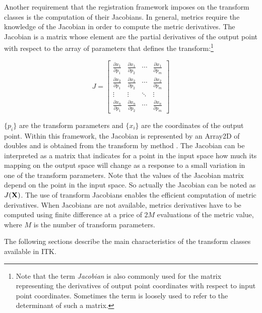 
Another requirement that the registration framework imposes on the transform
classes is the computation of their Jacobians. In general, metrics require
the knowledge of the Jacobian in order to compute the metric derivatives.
The Jacobian is a matrix whose element are the partial derivatives of the
output point with respect to the array of parameters that defines the
transform:\footnote{Note that the term \emph{Jacobian} is also commonly used
for the matrix representing the derivatives of output point coordinates with
respect to input point coordinates. Sometimes the term is loosely used to
refer to the determinant of such a matrix.}

\begin{equation}
J=\left[ \begin{array}{cccc}
\frac{\partial x_{1}}{\partial p_{1}} & 
\frac{\partial x_{1}}{\partial p_{2}} & 
\cdots  & \frac{\partial x_{1}}{\partial p_{m}}\\
\frac{\partial x_{2}}{\partial p_{1}} & 
\frac{\partial x_{2}}{\partial p_{2}} & 
\cdots  & \frac{\partial x_{2}}{\partial p_{m}}\\
\vdots  & \vdots  & \ddots  & \vdots \\
\frac{\partial x_{n}}{\partial p_{1}} & 
\frac{\partial x_{n}}{\partial p_{2}} & 
\cdots  & \frac{\partial x_{n}}{\partial p_{m}}
\end{array}\right]
\end{equation}

$\{p_i\}$ are the transform parameters and $\{x_i\}$ are the
coordinates of the output point.  Within this framework, the Jacobian is
represented by an
Array2D of doubles and is obtained from the transform by method
. The Jacobian can be interpreted as a matrix that
indicates for a point in the input space how much its mapping on the output
space will change as a response to a small variation in one of the transform
parameters. Note that the values of the Jacobian matrix depend on the point
in the input space. So actually the Jacobian can be noted as $J(\bf{X})$. The
use of transform Jacobians enables the efficient computation of metric
derivatives. When Jacobians are not available, metrics derivatives have to be
computed using finite difference at a price of $2M$ evaluations of the metric
value, where $M$ is the number of transform parameters.

The following sections describe the main characteristics of the transform
classes available in ITK.

